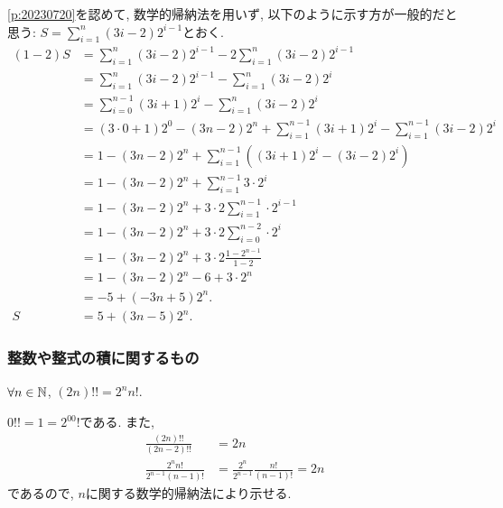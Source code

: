\begin{rem}
  \cref{p:20230720}を認めて,
  数学的帰納法を用いず, 以下のように示す方が一般的だと思う:
  $S=\sum_{i=1}^n (3i-2)2^{i-1}$とおく.
  \begin{align*}
    (1-2)S
    &=\sum_{i=1}^n (3i-2)2^{i-1}-2\sum_{i=1}^n (3i-2)2^{i-1}\\
    &=\sum_{i=1}^n (3i-2)2^{i-1}-\sum_{i=1}^n (3i-2)2^{i}\\
    &=\sum_{i=0}^{n-1} (3i+1)2^{i}-\sum_{i=1}^n (3i-2)2^{i}\\
    &=(3\cdot0+1)2^{0}-(3n-2)2^{n}+\sum_{i=1}^{n-1} (3i+1)2^{i}-\sum_{i=1}^{n-1} (3i-2)2^{i}\\
    &=1-(3n-2)2^{n}+\sum_{i=1}^{n-1} ((3i+1)2^{i}-(3i-2)2^{i})\\
    &=1-(3n-2)2^{n}+\sum_{i=1}^{n-1}3\cdot 2^{i}\\
    &=1-(3n-2)2^{n}+3\cdot 2\sum_{i=1}^{n-1}\cdot 2^{i-1}\\
    &=1-(3n-2)2^{n}+3\cdot 2\sum_{i=0}^{n-2}\cdot 2^{i}\\
    &=1-(3n-2)2^{n}+3\cdot 2\frac{1-2^{n-1}}{1-2}\\
    &=1-(3n-2)2^{n}-6+3\cdot 2^{n}\\
    &=-5+(-3n+5)2^{n}.\\
    S&=5+(3n-5)2^{n}.
  \end{align*}
\end{rem}


\subsubsection{整数や整式の積に関するもの}
\begin{prop}
  \label{p:20230723}
  $\forall n\in \mathbb{N}$,
  $(2n)!!=2^nn!$.
\end{prop}

\begin{proof**}
  $0!!=1=2^00!$である.
  また,
  \begin{align*}
    \frac{(2n)!!}{(2n-2)!!}&=2n\\
    \frac{2^nn!}{2^{n-1}(n-1)!}&=\frac{2^n}{2^{n-1}}\frac{n!}{(n-1)!}=2n
  \end{align*}
  であるので,
  $n$に関する数学的帰納法により示せる.
\end{proof**}


